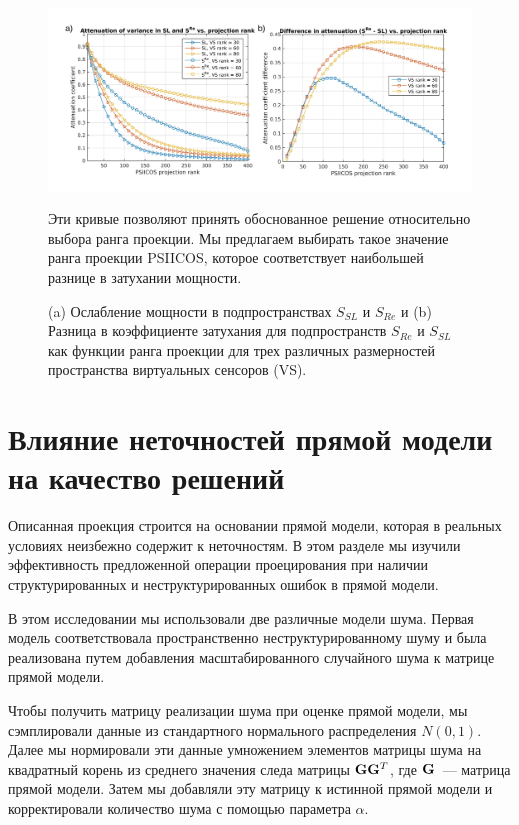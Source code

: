 \begin{figure}[htbp]
\includegraphics[width=\textwidth]{../images/psiicos_paper/Figure14_hr.jpg}
\caption{(a) Ослабление мощности в подпространствах $S_{SL}$ и $S_{Re}$ и (b)
    Разница в коэффициенте затухания для подпространств $S_{Re}$ и $S_{SL}$ как
    функции ранга проекции для трех различных размерностей пространства виртуальных
    сенсоров (VS).
}\label{fig:14}
    Эти кривые позволяют принять обоснованное решение
    относительно выбора ранга проекции.  Мы предлагаем выбирать такое значение ранга
    проекции PSIICOS, которое соответствует наибольшей разнице в затухании
    мощности.
\end{figure}

\section{Влияние неточностей прямой модели на качество решений}\label{sec:forward_model_errors_effect}

Описанная проекция строится на основании прямой модели, которая в реальных
условиях неизбежно содержит к неточностям.  В этом разделе мы изучили
эффективность предложенной операции проецирования при наличии структурированных
и неструктурированных ошибок в прямой модели.

В этом исследовании мы использовали две различные модели шума.  Первая модель
соответствовала пространственно неструктурированному шуму и была реализована
путем добавления масштабированного случайного шума к матрице прямой модели.

Чтобы получить матрицу реализации шума при оценке прямой модели, мы
сэмплировали данные из стандартного нормального распределения $N(0,1)$.  Далее
мы нормировали эти данные умножением элементов матрицы шума на квадратный корень
из среднего значения следа матрицы $\mathbf{G}\mathbf{G}^T$, где
$\mathbf{G}$~--- матрица прямой модели. Затем мы добавляли эту матрицу к
истинной прямой модели и корректировали количество шума с помощью
параметра $\alpha$.

